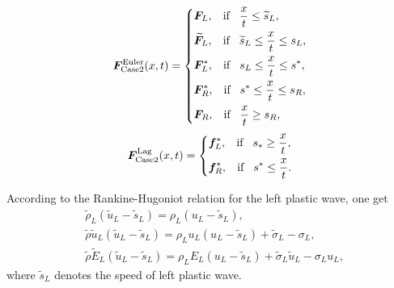 \documentclass{article}
\numberwithin{equation}{section}
\numberwithin{table}{section}
\begin{document}
 \begin{equation}\label{eq:HLLCEP}
   \bm{F}^{\text{Euler}}_{\text{Case2}}(x,t) = \left\{ \begin{aligned}
	   & \bm{F}_L, \hspace{0.3cm} \text{if} \hspace{0.3cm} \frac{x}{t}\le \widetilde{s}_L, \\
		&  \widetilde{\bm{F}}_L, \hspace{0.3cm} \text{if} \hspace{0.3cm} \widetilde{s}_L\le \frac{x}{t} \le   s_L , \\
		&\bm{F}_L^*, \hspace{0.3cm} \text{if} \hspace{0.3cm} s_L\le \frac{x}{t} \le s^*, \\
		& \bm{F}_R^*, \hspace{0.3cm} \text{if} \hspace{0.3cm} s^*\le \frac{x}{t} \le s_R,\\
		& \bm{F}_R, \hspace{0.3cm} \text{if} \hspace{0.3cm} \frac{x}{t}\ge s_R, \\
	  \end{aligned}
	\right.
  \end{equation}
\begin{equation}
	\bm{F}^{\text{Lag}}_{\text{Case2}}(x,t) = \left\{ \begin{aligned}
		& \bm{f}_L^*, \hspace{0.3cm} \text{if} \hspace{0.3cm} s_*\ge \frac{x}{t},\\
		& \bm{f}_R^*, \hspace{0.3cm} \text{if} \hspace{0.3cm} s^*\le \frac{x}{t}.\\
	  \end{aligned}
	\right.
  \end{equation}

 According to the Rankine-Hugoniot relation for the left  plastic wave, one get
  \begin{align}
	&\widetilde{\rho}_L(\widetilde{u}_L-\widetilde{s}_L) = \rho_L(u_L-\widetilde{s}_L), \label{eq:RHp1}\\
	&\widetilde{\rho}\widetilde{u}_L(\widetilde{u}_L-\widetilde{s}_L) = \rho_Lu_L(u_L-\widetilde{s}_L)+\widetilde{\sigma}_L-\sigma_L,  \label{eq:RHp2}\\
	&\widetilde{\rho}\widetilde{E}_L(\widetilde{u}_L-\widetilde{s}_L) = \rho_LE_L(u_L-\widetilde{s}_L)+\widetilde{\sigma}_L \widetilde{u}_L-\sigma_Lu_L, \label{eq:RHp3}
\end{align}
where $\widetilde{s}_L$ denotes the speed of left plastic wave.
\end{document}

